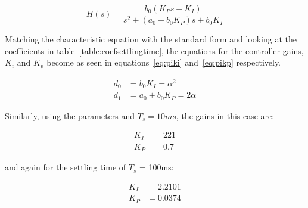 \begin{equation}
\label{eq:pireducedtf}
H(s) = \dfrac{b_0(K_Ps + K_I)}{s^2 + (a_0 + b_0 K_P)s + b_0 K_I }
\end{equation}

Matching the characteristic equation with the standard form and looking at the coefficients in table~\ref{table:coefsettlingtime}, the equations for the controller gains, $K_i$ and $K_p$ become as seen in equations~\ref{eq:piki} and~\ref{eq:pikp} respectively.

\begin{align}
\label{eq:piki}
d_0 &= b_0 K_I = \alpha^2
\\
\label{eq:pikp}
d_1 &= a_0 + b_0 K_P = 2\alpha
\end{align}

Similarly, using the parameters and $T_s=10ms$, the gains in this case are:

\begin{align*}
K_I &= 221
\\
K_P &= 0.7
\end{align*}
 
 and again for the settling time of $T_s$ = 100ms:
 
 \begin{align*}
 K_I &= 2.2101
 \\
 K_P &= 0.0374
 \end{align*}
 